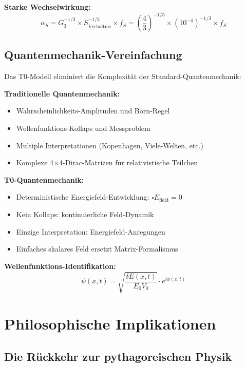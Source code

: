 \documentclass[12pt,a4paper]{report}
\begin{document}
	\textbf{Starke Wechselwirkung:}
	\begin{equation}
		\alpha_S = G_3^{-1/3} \times S_{\text{Verhältnis}}^{-1/3} \times f_S = \left(\frac{4}{3}\right)^{-1/3} \times (10^{-4})^{-1/3} \times f_S
	\end{equation}
	
	\subsection{Quantenmechanik-Vereinfachung}
	\label{subsec:quantum_mechanics_simplification}
	
	Das T0-Modell eliminiert die Komplexität der Standard-Quantenmechanik:
	
	\textbf{Traditionelle Quantenmechanik:}
	\begin{itemize}
		\item Wahrscheinlichkeits-Amplituden und Born-Regel
		\item Wellenfunktions-Kollaps und Messproblem
		\item Multiple Interpretationen (Kopenhagen, Viele-Welten, etc.)
		\item Komplexe 4×4-Dirac-Matrizen für relativistische Teilchen
	\end{itemize}
	
	\textbf{T0-Quantenmechanik:}
	\begin{itemize}
		\item Deterministische Energiefeld-Entwicklung: $\square E_{\text{field}} = 0$
		\item Kein Kollaps: kontinuierliche Feld-Dynamik
		\item Einzige Interpretation: Energiefeld-Anregungen
		\item Einfaches skalares Feld ersetzt Matrix-Formalismus
	\end{itemize}
	
	\textbf{Wellenfunktions-Identifikation:}
	\begin{equation}
		\psi(x,t) = \sqrt{\frac{\delta E(x,t)}{E_0 V_0}} \cdot e^{i\phi(x,t)}
	\end{equation}
	
	\section{Philosophische Implikationen}
	\label{sec:philosophical_implications}
	
	\subsection{Die Rückkehr zur pythagoreischen Physik}
	\label{subsec:pythagorean_physics}
	
\end{document}

